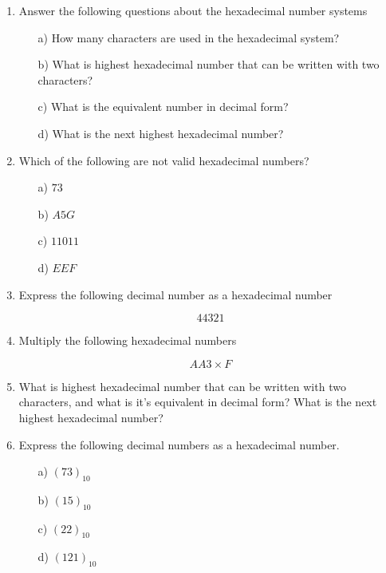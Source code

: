\documentclass[]{report}
\begin{document}
\begin{enumerate}
	\item Answer the following questions about the hexadecimal number systems
	\begin{itemize}
		\item[a)] How many characters are used in the hexadecimal system?
		\item[b)] What is highest hexadecimal number that can be written with two characters? \item[c)] What is the equivalent number in decimal form?
		\item[d)] What is the next highest hexadecimal number?
	\end{itemize}
	
	
	\item Which of the following are not valid hexadecimal numbers?
	\begin{multicols}{4}
		\begin{itemize}
			\item[a)] $73$
			\item[b)] $A5G$
			\item[c)] $11011$
			\item[d)] $EEF	$
		\end{itemize}
	\end{multicols}

\item Express the following decimal number as a hexadecimal number

\[44321\]



\item Multiply the following hexadecimal numbers

\[AA3 \times F\]




\item What is highest hexadecimal number that can be written with two characters, and what is it's equivalent in decimal form?
What is the next highest hexadecimal number?






	
	\item Express the following decimal numbers as a hexadecimal number.
	\begin{multicols}{4}
		\begin{itemize}
			\item[a)] $(73)_{10}$
			\item[b)] $(15)_{10}$
			\item[c)] $(22)_{10}$
			\item[d)] $(121)_{10}$
		\end{itemize}
	\end{multicols}
	

\end{enumerate}
\end{document}

